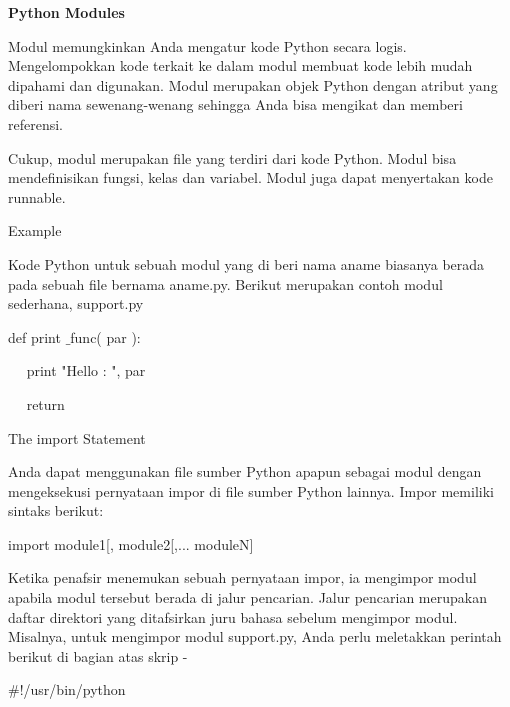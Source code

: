 
\sloppy
\begin{center}{\fontsize{16pt}{16pt}\selectfont \textbf{Python Modules} \\}\end{center} \par
\vspace{12pt}
\noindent 
Modul memungkinkan Anda mengatur kode Python secara logis. Mengelompokkan kode terkait ke dalam modul membuat kode lebih mudah dipahami dan digunakan. Modul merupakan objek Python dengan atribut yang diberi nama sewenang-wenang sehingga Anda bisa mengikat dan memberi referensi. \par
\noindent 
Cukup, modul merupakan file yang terdiri dari kode Python. Modul bisa mendefinisikan fungsi, kelas dan variabel. Modul juga dapat menyertakan kode runnable. \par
\vspace{12pt}
\noindent 
Example \par
\noindent 
Kode Python untuk sebuah modul yang di beri nama aname biasanya berada pada sebuah file bernama aname.py. Berikut merupakan contoh modul sederhana, support.py \par
\noindent 
 \hspace*{0.5in} def print $  \_  $func( par ): \par
\noindent 
 \hspace*{0.5in} ~~ print "Hello : ", par \par
\noindent 
 \hspace*{0.5in} ~~ return \par
\vspace{12pt}
\noindent 
The $  $import $  $Statement \par
\noindent 
Anda dapat menggunakan file sumber Python apapun sebagai modul dengan mengeksekusi pernyataan impor di file sumber Python lainnya. Impor memiliki sintaks berikut: \par
\noindent 
 \hspace*{0.5in} import module1[, module2[,... moduleN] \par
\noindent 
Ketika penafsir menemukan sebuah pernyataan impor, ia mengimpor modul apabila modul tersebut berada di jalur pencarian. Jalur pencarian merupakan daftar direktori yang ditafsirkan juru bahasa sebelum mengimpor modul. Misalnya, untuk mengimpor modul support.py, Anda perlu meletakkan perintah berikut di bagian atas skrip - \par
\noindent 
 \hspace*{0.5in}  $  \#  $!/usr/bin/python \par
